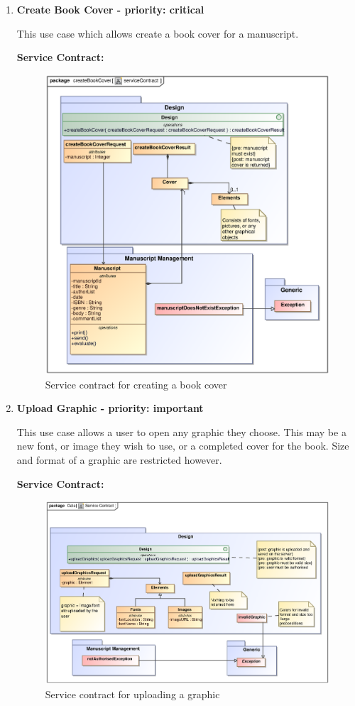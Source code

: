 \begin{enumerate}
\newpage
\item \textbf{Create Book Cover - priority: critical}
\par{This use case which allows create a book cover for a  manuscript.}
\par{\textbf{Service Contract:} 
}
 \begin{figure}[h]
\centering
\includegraphics[scale=0.8,width=400px]{epsImages/Design/createBookCover.eps}
\caption{Service contract for creating a book cover}
\end{figure}

\newpage
\item \textbf{Upload Graphic - priority: important}\\
\par{This use case allows a user to open any graphic they choose. This may be a new font, or image they wish to use, or a completed cover for the book. Size and format of a graphic are restricted however.}
\par{\textbf{Service Contract:}}
\begin{figure}[h]
\centering
\includegraphics[scale=0.8,width=400px]{epsImages/Design/uploadGraphicsServiceContract.eps}
\caption{Service contract for uploading a graphic}
\end{figure}
\end{enumerate}

